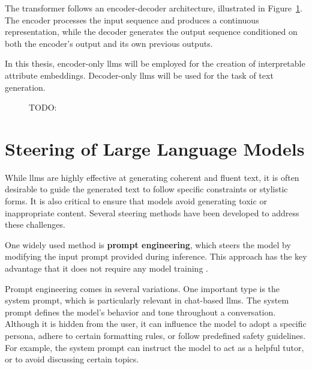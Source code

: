The transformer follows an encoder-decoder architecture, illustrated in Figure~\ref{fig:transformerArchitecture}. The encoder processes the input sequence and produces a continuous representation, while the decoder generates the output sequence conditioned on both the encoder's output and its own previous outputs.

In this thesis, encoder-only \acp{llm} will be employed for the creation of interpretable attribute embeddings. Decoder-only \acp{llm} will be used for the task of text generation.

\begin{figure}[ht]
  \begin{center}
    
  \end{center}
  \caption{TODO:} %
  \label{fig:transformerArchitecture}
\end{figure}

\section{Steering of Large Language Models}
\label{sec:background:llm:steering}

While \acp{llm} are highly effective at generating coherent and fluent text, it is often desirable to guide the generated text to follow specific constraints or stylistic forms. It is also critical to ensure that models avoid generating toxic or inappropriate content. Several steering methods have been developed to address these challenges.

One widely used method is \textbf{prompt engineering}, which steers the model by modifying the input prompt provided during inference. This approach has the key advantage that it does not require any model training \cite{schulhoffPromptReportSystematic2024}.

Prompt engineering comes in several variations. One important type is the system prompt, which is particularly relevant in chat-based \acp{llm}. The system prompt defines the model's behavior and tone throughout a conversation. Although it is hidden from the user, it can influence the model to adopt a specific persona, adhere to certain formatting rules, or follow predefined safety guidelines. For example, the system prompt can instruct the model to act as a helpful tutor, or to avoid discussing certain topics.

